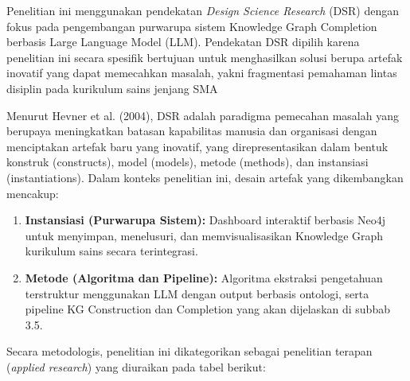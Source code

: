 \documentclass[
]{article}
\begin{document}
Penelitian ini menggunakan pendekatan \emph{Design Science Research}
(DSR) dengan fokus pada pengembangan purwarupa sistem Knowledge Graph
Completion berbasis Large Language Model (LLM). Pendekatan DSR dipilih
karena penelitian ini secara spesifik bertujuan untuk menghasilkan
solusi berupa artefak inovatif yang dapat memecahkan masalah, yakni
fragmentasi pemahaman lintas disiplin pada kurikulum sains jenjang SMA

Menurut Hevner et al. (2004), DSR adalah paradigma pemecahan masalah
yang berupaya meningkatkan batasan kapabilitas manusia dan organisasi
dengan menciptakan artefak baru yang inovatif, yang direpresentasikan
dalam bentuk konstruk (constructs), model (models), metode (methods),
dan instansiasi (instantiations). Dalam konteks penelitian ini, desain
artefak yang dikembangkan mencakup:

\begin{enumerate}
\def\labelenumi{\arabic{enumi}.}
\item
  \textbf{Instansiasi (Purwarupa Sistem):} Dashboard interaktif berbasis
  Neo4j untuk menyimpan, menelusuri, dan memvisualisasikan Knowledge
  Graph kurikulum sains secara terintegrasi.
\item
  \textbf{Metode (Algoritma dan Pipeline):} Algoritma ekstraksi
  pengetahuan terstruktur menggunakan LLM dengan output berbasis
  ontologi, serta pipeline KG Construction dan Completion yang akan
  dijelaskan di subbab 3.5.
\end{enumerate}

Secara metodologis, penelitian ini dikategorikan sebagai penelitian
terapan (\emph{applied research}) yang diuraikan pada tabel berikut:
\end{document}
